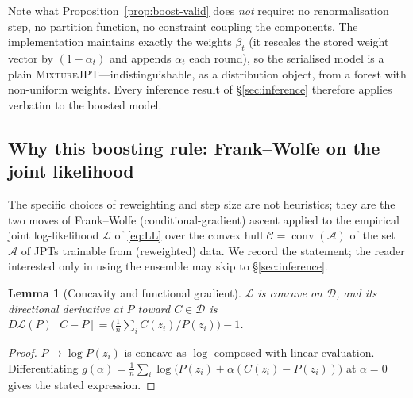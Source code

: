 \documentclass[11pt]{article}
\theoremstyle{plain}
\newtheorem{lemma}[theorem]{Lemma}
\theoremstyle{definition}
\theoremstyle{remark}
\newcommand{\Dens}{\mathcal{D}}
\newcommand{\mixture}{\textsc{MixtureJPT}}
\begin{document}
Note what Proposition~\ref{prop:boost-valid} does \emph{not} require: no
renormalisation step, no partition function, no constraint coupling the
components. The implementation maintains exactly the weights $\beta_t$
(it rescales the stored weight vector by $(1-\alpha_t)$ and appends
$\alpha_t$ each round), so the serialised model is a plain
\mixture{}---indistinguishable, as a distribution object, from a forest
with non-uniform weights. Every inference result of \S\ref{sec:inference}
therefore applies verbatim to the boosted model.

\subsection{Why this boosting rule: Frank--Wolfe on the joint likelihood}
\label{sec:fw}

The specific choices of reweighting and step size are not heuristics; they
are the two moves of Frank--Wolfe (conditional-gradient) ascent
\citep{frankwolfe1956,jaggi2013fw} applied to the empirical joint
log-likelihood $\mathcal{L}$ of \eqref{eq:LL} over the convex hull
$\mathcal{C}=\operatorname{conv}(\mathcal{A})$ of the set $\mathcal{A}$ of
JPTs trainable from (reweighted) data. We record the statement; the
reader interested only in using the ensemble may skip to
\S\ref{sec:inference}.

\begin{lemma}[Concavity and functional gradient]
\label{lem:grad}
$\mathcal{L}$ is concave on $\Dens$, and its directional derivative at
$P$ toward $C\in\Dens$ is
$D\mathcal{L}(P)[C-P]=\big(\tfrac1n\sum_i C(z_i)/P(z_i)\big)-1$.
\end{lemma}
\begin{proof}
$P\mapsto\log P(z_i)$ is concave as $\log$ composed with linear
evaluation. Differentiating
$g(\alpha)=\frac1n\sum_i\log\big(P(z_i)+\alpha(C(z_i)-P(z_i))\big)$ at
$\alpha=0$ gives the stated expression.
\end{proof}
\end{document}
